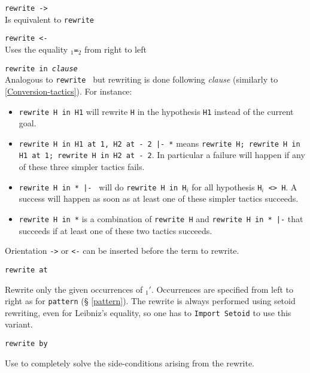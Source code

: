 \begin{Variants}
\item {\tt rewrite -> {\term}}\\
  Is equivalent to {\tt rewrite \term}

\item {\tt rewrite <- {\term}}\\
  Uses the equality \term$_1${\tt=}\term$_2$ from right to left

\item {\tt rewrite {\term} in \textit{clause}}
  \\
  Analogous to {\tt rewrite {\term}} but rewriting is done following
  \textit{clause} (similarly to \ref{Conversion-tactics}). For
  instance:
  \begin{itemize}
  \item \texttt{rewrite H in H1} will rewrite \texttt{H} in the hypothesis
    \texttt{H1} instead of the current goal.
  \item \texttt{rewrite H in H1 at 1, H2 at - 2 |- *} means \texttt{rewrite H; rewrite H in H1 at 1;
      rewrite H in H2 at - 2}. In particular a failure will happen if any of
    these three simpler tactics fails. 
  \item \texttt{rewrite H in * |- } will do \texttt{rewrite H in
      H$_i$} for all hypothesis \texttt{H$_i$ <> H}. A success will happen
    as soon as at least one of these simpler tactics succeeds.
  \item \texttt{rewrite H in *} is a combination of \texttt{rewrite H} 
    and \texttt{rewrite H in * |-} that succeeds if at
    least one of these two tactics succeeds. 
  \end{itemize}
  Orientation {\tt ->} or {\tt <-} can be
  inserted before the term to rewrite.

\item {\tt rewrite {\term} at {\occlist}}

  Rewrite only the given occurrences of \term$_1'$. Occurrences are
  specified from left to right as for \texttt{pattern} (\S
  \ref{pattern}). The rewrite is always performed using setoid
  rewriting, even for Leibniz's equality, so one has to 
  \texttt{Import Setoid} to use this variant.

\item {\tt rewrite {\term} by {\tac}}

  Use {\tac} to completely solve the side-conditions arising from the
  rewrite.


\end{Variants}
